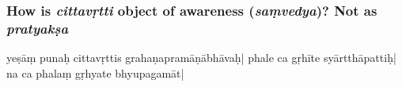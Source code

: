 \subsubsection{How is \emph{cittavṛtti} object of awareness (\emph{saṃvedya})? Not as \emph{pratyakṣa}}
yeṣāṃ punaḥ 
cittavṛttis 
%
grahaṇapramāṇā\-bhāvaḥ| 
phale ca gṛhīte %
\mde syārtthāpattiḥ| 
na ca phalaṃ gṛhya\-te %
%
bhyupagamāt| 
